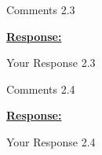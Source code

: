 \documentclass{article}
\begin{document}
\vspace{0.3cm}


\begin{cmt}{}{}

Comments 2.3

\end{cmt}
\vspace{0.1cm}
\noindent
\underline{\textbf{Response:}}
\vspace{0.2cm}

Your Response 2.3

\vspace{0.3cm}


\begin{cmt}{}{}

Comments 2.4

\end{cmt}
\vspace{0.1cm}
\noindent
\underline{\textbf{Response:}}
\vspace{0.2cm}

Your Response 2.4

\vspace{0.3cm}
\end{document}
